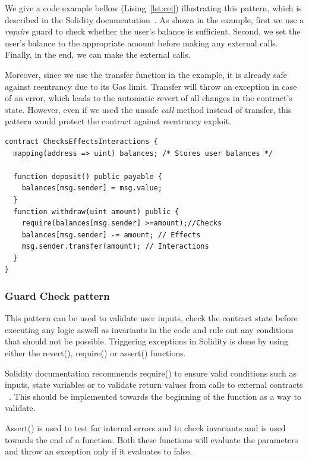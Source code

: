 \documentclass[10pt,conference]{IEEEtran}
\begin{document}
We give a code example bellow (Lising~\ref{lst:cei}) illustrating this pattern, which is described in the Solidity documentation~\cite{solidity}. As shown in the example, first we use a \textit{require} guard to check whether the user's balance is sufficient. Second, we set the user's balance to the appropriate amount before making any external calls. Finally, in the end, we can make the external calls.

Moreover, since we use the transfer function in the example, it is already safe against reentrancy due to its Gas limit. Transfer will throw an exception in case of an error, which leads to the automatic revert of all changes in the contract's state. 
However, even if we used the unsafe \textit{call} method instead of transfer, this pattern would protect the contract against reentrancy exploit. 

\begin{lstlisting}[language=Solidity, caption=Checks Effects Interactions pattern, label={lst:cei}]
contract ChecksEffectsInteractions {
  mapping(address => uint) balances; /* Stores user balances */
    
  function deposit() public payable {
    balances[msg.sender] = msg.value;
  }
  function withdraw(uint amount) public {
    require(balances[msg.sender] >=amount);//Checks
    balances[msg.sender] -= amount; // Effects
    msg.sender.transfer(amount); // Interactions
  }
}
\end{lstlisting}

\subsubsection{Guard Check pattern}

This pattern can be used to validate user inputs, check the contract state before executing any logic aswell as invariants in the code and rule out any conditions that should not be possible. Triggering exceptions in Solidity is done by using either the revert(), require() or assert() functions. 

Solidity documentation recommends require() to ensure valid conditions such as inputs, state variables or to validate return values from calls to external contracts ~\cite{solidity}. This should be implemented towards the beginning of the function as a way to validate. 

Assert() is used to test for internal errors and to check invariants and is used towards the end of a function. Both these functions will evaluate the parameters and throw an exception only if it evaluates to false. 
\end{document}
